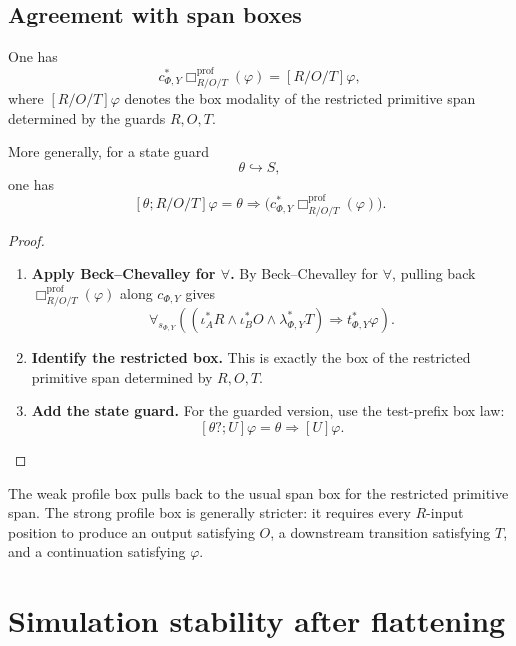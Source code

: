 \subsection{Agreement with span boxes}
\label{subsec:poly-relative-profile-box-span-agreement}

\begin{theorem}
\label{thm:poly-relative-profile-box-span-agreement}
One has
\[
c_{\Phi,Y}^{\ast}
\Box^{\mathrm{prof}}_{R/O/T}(\varphi)
=
[R/O/T]\varphi,
\]
where \([R/O/T]\varphi\) denotes the box modality of the restricted primitive
span determined by the guards \(R,O,T\).

More generally, for a state guard
\[
\theta\hookrightarrow S,
\]
one has
\[
[\theta;R/O/T]\varphi
=
\theta\Rightarrow
\bigl(
c_{\Phi,Y}^{\ast}
\Box^{\mathrm{prof}}_{R/O/T}(\varphi)
\bigr).
\]
\end{theorem}

\begin{proof}
\leavevmode
\begin{enumerate}
\item \textbf{Apply Beck--Chevalley for \(\forall\).}
By Beck--Chevalley for \(\forall\), pulling back
\(\Box^{\mathrm{prof}}_{R/O/T}(\varphi)\) along \(c_{\Phi,Y}\) gives
\[
\forall_{s_{\Phi,Y}}
\left(
(\iota_A^\ast R
\wedge
\iota_B^\ast O
\wedge
\lambda_{\Phi,Y}^\ast T)
\Rightarrow
t_{\Phi,Y}^\ast\varphi
\right).
\]

\item \textbf{Identify the restricted box.}
This is exactly the box of the restricted primitive span determined by
\(R,O,T\).

\item \textbf{Add the state guard.}
For the guarded version, use the test-prefix box law:
\[
[\theta?;U]\varphi
=
\theta\Rightarrow[U]\varphi.
\]
\end{enumerate}
\end{proof}

\begin{remark}
\label{rem:poly-relative-weak-strong-profile-boxes}
The weak profile box pulls back to the usual span box for the restricted
primitive span.  The strong profile box is generally stricter: it requires
every \(R\)-input position to produce an output satisfying \(O\), a downstream
transition satisfying \(T\), and a continuation satisfying \(\varphi\).
\end{remark}

\section{Simulation stability after flattening}
\label{sec:poly-relative-simulation-stability}

